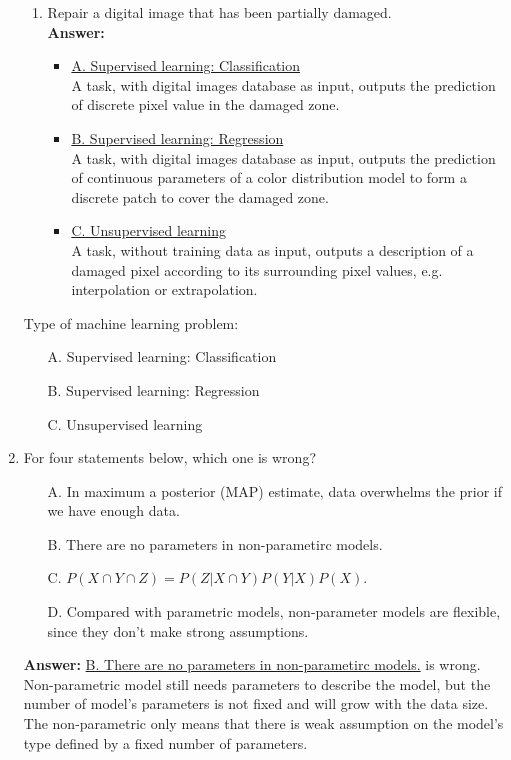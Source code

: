\documentclass{article}
\begin{document}
\begin{enumerate}
\begin{enumerate}
		\item Repair a digital image that has been partially damaged. \\
		\textbf{Answer:}
		\begin{itemize}
			\item \underline{A. Supervised learning: Classification}\\
			A task, with digital images database as input, outputs the prediction of discrete pixel value in the damaged zone.
			\item \underline{B. Supervised learning: Regression}\\
			A task, with digital images database as input, outputs the prediction of continuous parameters of a color distribution model to form a discrete patch to cover the damaged zone.
			\item \underline{C. Unsupervised learning}\\
			A task, without training data as input, outputs a description of a damaged pixel according to its surrounding pixel values, e.g. interpolation or extrapolation.
		\end{itemize}
	\end{enumerate}
	Type of machine learning problem:
	\begin{itemize}
		\item [A.] Supervised learning: Classification
		\item [B.] Supervised learning: Regression
		\item [C.] Unsupervised learning
	\end{itemize}
	
	\item For four statements below, which one is wrong?
	\begin{itemize}
		\item [A.] In maximum a posterior (MAP) estimate, data overwhelms the prior if we have enough data.
		\item [B.] There are no parameters in non-parametirc models.
		\item [C.] $P(X \cap Y \cap Z)=P(Z|X \cap Y) P(Y|X) P(X)$.
		\item [D.] Compared with parametric models, non-parameter models are flexible, since they don't make strong assumptions.
	\end{itemize}
	\textbf{Answer:}
	\underline{B. There are no parameters in non-parametirc models.} is wrong.\\
	Non-parametric model still needs parameters to describe the model, but the number of model's parameters is not fixed and will grow with the data size. The non-parametric only means that there is weak assumption on the model's type defined by a fixed number of parameters.
	

\end{enumerate}
\end{document}
